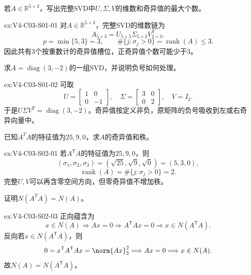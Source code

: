 \begin{SLChapterExercisePairSection}
\begin{exercise}\label{ex:V4-C03-S01-01}
若$A\in\mathbb R^{5\times3}$，写出完整SVD中$U,\Sigma,V$的维数和奇异值的最大个数。
\end{exercise}
\ifSLFullEdition
{}\label{sol:V4-C03-S01-01}
\begin{chapterexercisesolution}{ex:V4-C03-S01-01}
对$A\in\mathbb R^{5\times3}$，完整SVD的维数链为
\[
A_{5\times3}
=U_{5\times5}\Sigma_{5\times3}V_{3\times3}^{\mathsf T},
\]
\[
p=\min\{5,3\}=3,
\qquad
\#\{j:\sigma_j>0\}=\operatorname{rank}(A)\le3.
\]
因此共有3个按重数计的奇异值槽位，正奇异值个数可能少于3。
\end{chapterexercisesolution}
\fi

\begin{exercise}\label{ex:V4-C03-S01-02}
求$A=\operatorname{diag}(3,-2)$的一组SVD，并说明负号如何处理。
\end{exercise}
\ifSLFullEdition
{}\label{sol:V4-C03-S01-02}
\begin{chapterexercisesolution}{ex:V4-C03-S01-02}
可取
\[
U=\begin{bmatrix}1&0\\0&-1\end{bmatrix},\quad
\Sigma=\begin{bmatrix}3&0\\0&2\end{bmatrix},\quad
V=I_2.
\]
于是$U\Sigma V^T=\operatorname{diag}(3,-2)$。奇异值按定义非负，原矩阵的负号吸收到左或右奇异向量中。
\end{chapterexercisesolution}
\fi

\begin{exercise}\label{ex:V4-C03-S02-01}
已知$A^TA$的特征值为$25,9,0$，求$A$的奇异值和秩。
\end{exercise}
\ifSLFullEdition
{}\label{sol:V4-C03-S02-01}
\begin{chapterexercisesolution}{ex:V4-C03-S02-01}
若$A^{\mathsf T}A$的特征值为$25,9,0$，则
\[
(\sigma_1,\sigma_2,\sigma_3)
=(\sqrt{25},\sqrt9,\sqrt0)=(5,3,0),
\]
\[
\operatorname{rank}(A)
=\#\{j:\sigma_j>0\}=2.
\]
完整$U,V$可以再含零空间方向，但零奇异值不增加秩。
\end{chapterexercisesolution}
\fi

\begin{exercise}\label{ex:V4-C03-S02-03}
证明$N(A^TA)=N(A)$。
\end{exercise}
\ifSLFullEdition
{}\label{sol:V4-C03-S02-03}
\begin{chapterexercisesolution}{ex:V4-C03-S02-03}
正向蕴含为
\[
x\in N(A)
\Longrightarrow Ax=0
\Longrightarrow A^{\mathsf T}Ax=0
\Longrightarrow x\in N(A^{\mathsf T}A).
\]
反向若$x\in N(A^{\mathsf T}A)$，则
\[
0=x^{\mathsf T}A^{\mathsf T}Ax
=\norm{Ax}_2^2
\Longrightarrow Ax=0
\Longrightarrow x\in N(A).
\]
故$N(A)=N(A^{\mathsf T}A)$。
\end{chapterexercisesolution}
\fi


\end{SLChapterExercisePairSection}
